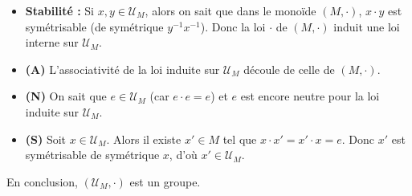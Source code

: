 \documentclass[a4paper,11pt]{article}
\begin{document}
\begin{demonstration}
\begin{itemize}
    \item \textbf{Stabilité :} Si $x, y \in \mathcal{U}_M$, alors on sait que dans le monoïde $(M, \cdot)$, $x \cdot y$ est symétrisable (de symétrique $y^{-1} x^{-1}$). Donc la loi $\cdot$ de $(M, \cdot)$ induit une loi interne sur $\mathcal{U}_M$.
    \item \textbf{(A)} L'associativité de la loi induite sur $\mathcal{U}_M$ découle de celle de $(M, \cdot)$.
    \item \textbf{(N)} On sait que $e \in \mathcal{U}_M$ (car $e \cdot e = e$) et $e$ est encore neutre pour la loi induite sur $\mathcal{U}_M$.
    \item \textbf{(S)} Soit $x \in \mathcal{U}_M$. Alors il existe $x' \in M$ tel que $x \cdot x' = x' \cdot x = e$. Donc $x'$ est symétrisable de symétrique $x$, d'où $x' \in \mathcal{U}_M$.
\end{itemize}
En conclusion, $(\mathcal{U}_M, \cdot)$ est un groupe.
\end{demonstration}
\end{document}
